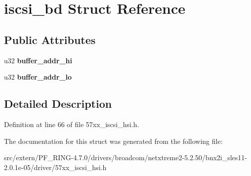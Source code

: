 \hypertarget{structiscsi__bd}{
\section{iscsi\_\-bd Struct Reference}
\label{structiscsi__bd}
}
\subsection*{Public Attributes}
\begin{DoxyCompactItemize}
\item 
\hypertarget{structiscsi__bd_ab80fd022bda7d9b0fcd2bc6b8ddf089a}{
u32 {\bfseries buffer\_\-addr\_\-hi}}
\label{structiscsi__bd_ab80fd022bda7d9b0fcd2bc6b8ddf089a}

\item 
\hypertarget{structiscsi__bd_ad7940620fcf53c0cd9e9784d0a387c8b}{
u32 {\bfseries buffer\_\-addr\_\-lo}}
\label{structiscsi__bd_ad7940620fcf53c0cd9e9784d0a387c8b}

\end{DoxyCompactItemize}


\subsection{Detailed Description}


Definition at line 66 of file 57xx\_\-iscsi\_\-hsi.h.



The documentation for this struct was generated from the following file:\begin{DoxyCompactItemize}
\item 
src/extern/PF\_\-RING-\/4.7.0/drivers/broadcom/netxtreme2-\/5.2.50/bnx2i\_\-sles11-\/2.0.1e-\/05/driver/57xx\_\-iscsi\_\-hsi.h\end{DoxyCompactItemize}
